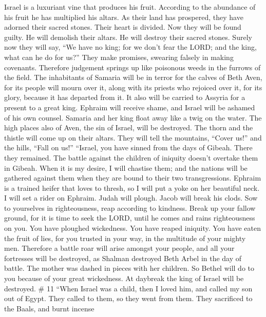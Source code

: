  Israel is a luxuriant vine that produces his fruit.
According to the abundance of his fruit he has multiplied his altars. As
their land has prospered, they have adorned their sacred stones.
 Their heart is divided. Now they will be found guilty. He
will demolish their altars. He will destroy their sacred stones.
 Surely now they will say, ``We have no king; for we don't
fear the LORD; and the king, what can he do for us?''  They
make promises, swearing falsely in making covenants. Therefore judgement
springs up like poisonous weeds in the furrows of the field.
 The inhabitants of Samaria will be in terror for the calves
of Beth Aven, for its people will mourn over it, along with its priests
who rejoiced over it, for its glory, because it has departed from it.
 It also will be carried to Assyria for a present to a great
king. Ephraim will receive shame, and Israel will be ashamed of his own
counsel.  Samaria and her king float away like a twig on the
water.  The high places also of Aven, the sin of Israel,
will be destroyed. The thorn and the thistle will come up on their
altars. They will tell the mountains, ``Cover us!'' and the hills,
``Fall on us!''  ``Israel, you have sinned from the days of
Gibeah. There they remained. The battle against the children of iniquity
doesn't overtake them in Gibeah.  When it is my desire, I
will chastise them; and the nations will be gathered against them when
they are bound to their two transgressions.  Ephraim is a
trained heifer that loves to thresh, so I will put a yoke on her
beautiful neck. I will set a rider on Ephraim. Judah will plough. Jacob
will break his clods.  Sow to yourselves in righteousness,
reap according to kindness. Break up your fallow ground, for it is time
to seek the LORD, until he comes and rains righteousness on you.
 You have ploughed wickedness. You have reaped iniquity.
You have eaten the fruit of lies, for you trusted in your way, in the
multitude of your mighty men.  Therefore a battle roar will
arise amongst your people, and all your fortresses will be destroyed, as
Shalman destroyed Beth Arbel in the day of battle. The mother was dashed
in pieces with her children.  So Bethel will do to you
because of your great wickedness. At daybreak the king of Israel will be
destroyed. \# 11  ``When Israel was a child, then I loved
him, and called my son out of Egypt.  They called to them,
so they went from them. They sacrificed to the Baals, and burnt incense
